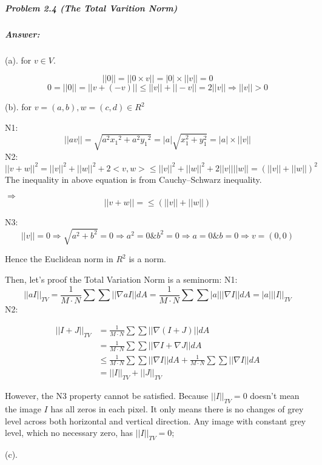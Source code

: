 \documentclass[11pt]{article}
\begin{document}
    \subparagraph{\texorpdfstring{\textbf{Problem 2.4} (The Total Varition
Norm)}{Problem 2.4 (The Total Varition Norm)}}\label{problem-2.4-the-total-varition-norm}

    \subparagraph{\texorpdfstring{\textbf{Answer:}}{Answer:}}\label{answer}

    (a). for \(v \in V\).

\[
||0|| = ||0\times v|| =|0|\times||v|| = 0
\] \[
0 = ||0|| = || v + (-v)|| \le ||v|| + ||-v|| = 2||v|| \Rightarrow ||v||>0
\]

    (b). for \(v =(a, b), w = (c, d) \in R^2\)

N1: \[
||av|| = \sqrt{a^2{x_1}^2+a^2{y_1}^2} = |a| \sqrt{x_1^2 + y_1^2} = |a|\times||v||
\] N2: \[
||v+w||^2 = ||v||^2 + ||w||^2 + 2<v,w> \le ||v||^2 + ||w||^2 + 2||v||||w|| = (||v|| + ||w||)^2
\] The inequality in above equation is from Cauchy--Schwarz inequality.

\(\Rightarrow\) \[
||v+w|| = \le (||v|| + ||w||)
\]

N3: \[
||v||=0 \Rightarrow \sqrt{a^2+b^2} =0 \Rightarrow a^2 =0 \& b^2=0 \Rightarrow a=0 \& b=0 \Rightarrow v= (0, 0)
\]

Hence the Euclidean norm in \(R^2\) is a norm.

Then, let's proof the Total Variation Norm is a seminorm: N1: \[
||aI||_{TV} = \frac{1}{M\cdot N} \sum \sum ||\nabla a I|| dA = \frac{1}{M\cdot N} \sum \sum |a| ||\nabla I|| dA = |a| ||I||_{TV}
\] N2:

\begin{eqnarray}
|| I + J||_{TV} &= \frac{1}{M\cdot N} \sum \sum ||\nabla (I+J)|| dA\\
&=\frac{1}{M\cdot N} \sum \sum ||\nabla I+ \nabla J|| dA\\
&\le \frac{1}{M\cdot N} \sum \sum ||\nabla I|| dA + \frac{1}{M\cdot N} \sum \sum ||\nabla I|| dA\\
&= || I||_{TV} + ||J||_{TV}
\end{eqnarray}

However, the N3 property cannot be satisfied. Because \(||I||_{TV} = 0\)
doesn't mean the image \(I\) has all zeros in each pixel. It only means
there is no changes of grey level across both horizontal and vertical
direction. Any image with constant grey level, which no necessary zero,
has \(||I||_{TV} = 0\);

    (c).
\end{document}
